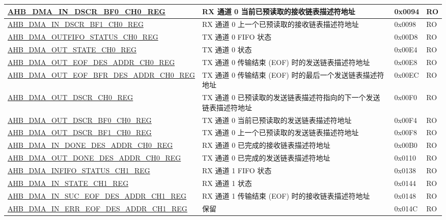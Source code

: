 \begin{longtable}{ | p{8cm} | p{8cm} | p{1.3cm} | p{1.5cm} | }
\hyperref[regdesc:AHBDMAINDSCRBF0CHNREG]{AHB\_DMA\_IN\_DSCR\_BF0\_CH0\_REG} & RX 通道 0 当前已预读取的接收链表描述符地址 & 0x0094 & RO \\ \hline
\hyperref[regdesc:AHBDMAINDSCRBF1CHNREG]{AHB\_DMA\_IN\_DSCR\_BF1\_CH0\_REG} & RX 通道 0 上一个已预读取的接收链表描述符地址 & 0x0098 & RO \\ \hline
\hyperref[regdesc:AHBDMAOUTFIFOSTATUSCHNREG]{AHB\_DMA\_OUTFIFO\_STATUS\_CH0\_REG} & TX 通道 0 FIFO 状态 & 0x00D8 & RO \\ \hline
\hyperref[regdesc:AHBDMAOUTSTATECHNREG]{AHB\_DMA\_OUT\_STATE\_CH0\_REG} & TX 通道 0 状态 & 0x00E4 & RO \\ \hline
\hyperref[regdesc:AHBDMAOUTEOFDESADDRCHNREG]{AHB\_DMA\_OUT\_EOF\_DES\_ADDR\_CH0\_REG} & TX 通道 0 传输结束 (EOF) 时的发送链表描述符地址 & 0x00E8 & RO \\ \hline
\hyperref[regdesc:AHBDMAOUTEOFBFRDESADDRCHNREG]{AHB\_DMA\_OUT\_EOF\_BFR\_DES\_ADDR\_CH0\_REG} & TX 通道 0 传输结束 (EOF) 时的最后一个发送链表描述符地址 & 0x00EC & RO \\ \hline
\hyperref[regdesc:AHBDMAOUTDSCRCHNREG]{AHB\_DMA\_OUT\_DSCR\_CH0\_REG} & TX 通道 0 已预读取的发送链表描述符指向的下一个发送链表描述符地址 & 0x00F0 & RO \\ \hline
\hyperref[regdesc:AHBDMAOUTDSCRBF0CHNREG]{AHB\_DMA\_OUT\_DSCR\_BF0\_CH0\_REG} & TX 通道 0 当前已预读取的发送链表描述符地址 & 0x00F4 & RO \\ \hline
\hyperref[regdesc:AHBDMAOUTDSCRBF1CHNREG]{AHB\_DMA\_OUT\_DSCR\_BF1\_CH0\_REG} & TX 通道 0 上一个已预读取的发送链表描述符地址 & 0x00F8 & RO \\ \hline
\hyperref[regdesc:AHBDMAINDONEDESADDRCHNREG]{AHB\_DMA\_IN\_DONE\_DES\_ADDR\_CH0\_REG} & RX 通道 0 已完成的接收链表描述符地址 & 0x00B0 & RO \\ \hline
\hyperref[regdesc:AHBDMAOUTDONEDESADDRCHNREG]{AHB\_DMA\_OUT\_DONE\_DES\_ADDR\_CH0\_REG} & TX 通道 0 已完成的发送链表描述符地址 & 0x0110 & RO \\ \hline
\hyperref[regdesc:AHBDMAINFIFOSTATUSCHNREG]{AHB\_DMA\_INFIFO\_STATUS\_CH1\_REG} & RX 通道 1 FIFO 状态 & 0x0138 & RO \\ \hline
\hyperref[regdesc:AHBDMAINSTATECHNREG]{AHB\_DMA\_IN\_STATE\_CH1\_REG} & RX 通道 1 状态 & 0x0144 & RO \\ \hline
\hyperref[regdesc:AHBDMAINSUCEOFDESADDRCHNREG]{AHB\_DMA\_IN\_SUC\_EOF\_DES\_ADDR\_CH1\_REG} & RX 通道 1 传输结束 (EOF) 时的接收链表描述符地址 & 0x0148 & RO \\ \hline
\hyperref[regdesc:AHBDMAINERREOFDESADDRCH1REG]{AHB\_DMA\_IN\_ERR\_EOF\_DES\_ADDR\_CH1\_REG} & 保留 & 0x014C & RO \\ \hline

\end{longtable}
